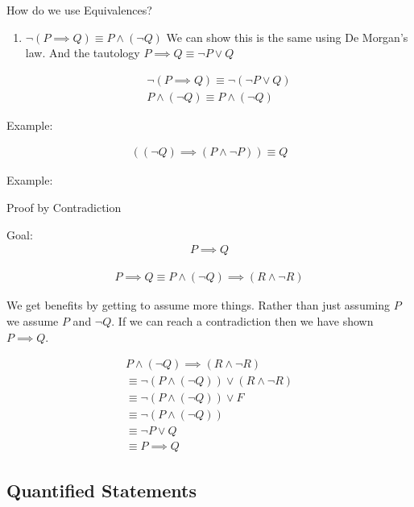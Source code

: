 \documentclass{report}
\begin{document}
How do we use Equivalences?
\begin{enumerate}
    \item $\neg (P \implies Q) \equiv P \land (\neg Q)$
        We can show this is the same using De Morgan's law.
        And the tautology $P \implies Q \equiv \neg P \lor Q$

        \begin{gather}
            \neg (P \implies Q) \equiv \neg (\neg P \lor Q)\\ 
            P \land (\neg Q) \equiv P \land (\neg Q)
        \end{gather}
\end{enumerate}

Example:
\begin{mdframed}
    \begin{gather}
        ((\neg Q) \implies (P \land \neg P)) \equiv Q
    \end{gather}
\end{mdframed}

Example:
\begin{mdframed}
    Proof by Contradiction

    Goal:
    \begin{gather}
        P \implies Q
    \end{gather}

    \begin{gather}
        P \implies Q \equiv P \land (\neg Q) \implies (R \land \neg R)
    \end{gather}

    We get benefits by getting to assume more things.
    Rather than just assuming $P$ we assume $P$ and
    $\neg Q$. If we can reach a contradiction then we
    have shown $P \implies Q$.
    

    \begin{gather}
        P \land (\neg Q) \implies (R \land \neg R) \\
        \equiv \neg (P \land (\neg Q)) \lor (R \land \neg R)\\
        \equiv \neg (P \land (\neg Q)) \lor F\\
        \equiv \neg (P \land (\neg Q))\\
        \equiv \neg P \lor Q\\
        \equiv P \implies Q
    \end{gather}
\end{mdframed}

\subsection{Quantified Statements}
\end{document}
